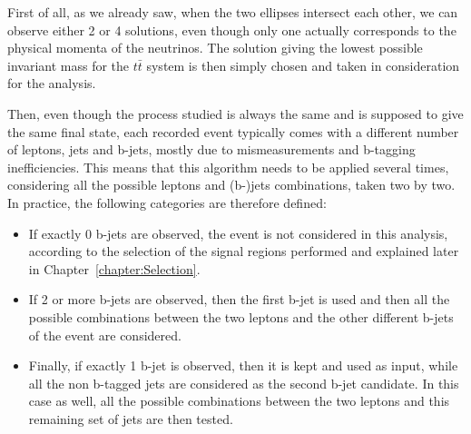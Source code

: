 \documentclass[a4paper, 10pt, openright]{report}
\begin{document}
First of all, as we already saw, when the two ellipses intersect each other, we can observe either 2 or 4 solutions, even though only one actually corresponds to the physical momenta of the neutrinos. The solution giving the lowest possible invariant mass for the $t \bar t$ system is then simply chosen and taken in consideration for the analysis.

Then, even though the process studied is always the same and is supposed to give the same final state, each recorded event typically comes with a different number of leptons, jets and b-jets, mostly due to mismeasurements and b-tagging inefficiencies. This means that this algorithm needs to be applied several times, considering all the possible leptons and (b-)jets combinations, taken two by two. In practice, the following categories are therefore defined: 
\begin{itemize}
\item If exactly 0 b-jets are observed, the event is not considered in this analysis, according to the selection of the signal regions performed and explained later in Chapter~\ref{chapter:Selection}.
\item If 2 or more b-jets are observed, then the first b-jet is used and then all the possible combinations between the two leptons and the other different b-jets of the event are considered.
\item Finally, if exactly 1 b-jet is observed, then it is kept and used as input, while all the non b-tagged jets are considered as the second b-jet candidate. In this case as well, all the possible combinations between the two leptons and this remaining set of jets are then tested.
\end{itemize}
\end{document}

